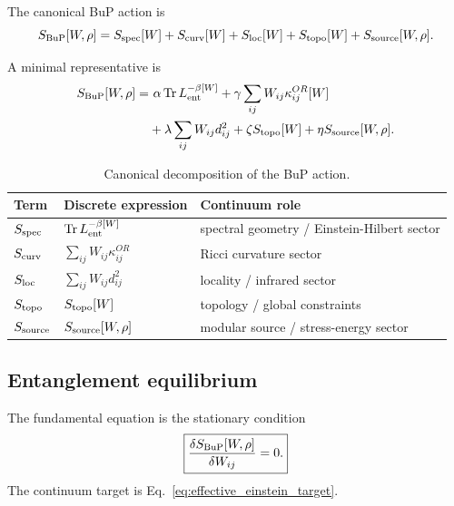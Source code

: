\documentclass[11pt,a4paper]{article}
\begin{document}
The canonical BuP action is
\begin{equation}
  S_{\rm BuP}[W,\rho]
  =
  S_{\rm spec}[W]
  +
  S_{\rm curv}[W]
  +
  S_{\rm loc}[W]
  +
  S_{\rm topo}[W]
  +
  S_{\rm source}[W,\rho].
  \label{eq:canonical_action_decomposition}
\end{equation}

A minimal representative is
\begin{equation}
\begin{aligned}
  S_{\rm BuP}[W,\rho]
  =
  &\ \alpha\,\mathrm{Tr}\,L_{\rm ent}^{-\beta[W]}
  +
  \gamma\sum_{ij}W_{ij}\kappa_{ij}^{OR}[W] \\
  &+
  \lambda\sum_{ij}W_{ij}d_{ij}^{2}
  +
  \zeta S_{\rm topo}[W]
  +
  \eta S_{\rm source}[W,\rho].
\end{aligned}
\label{eq:minimal_bup_action}
\end{equation}

\begin{table}[h]
\centering
\begin{tabular}{lll}
\toprule
Term & Discrete expression & Continuum role \\
\midrule
\(S_{\rm spec}\) &
\(\mathrm{Tr}\,L_{\rm ent}^{-\beta[W]}\) &
spectral geometry / Einstein-Hilbert sector \\
\(S_{\rm curv}\) &
\(\sum_{ij}W_{ij}\kappa^{OR}_{ij}\) &
Ricci curvature sector \\
\(S_{\rm loc}\) &
\(\sum_{ij}W_{ij}d_{ij}^{2}\) &
locality / infrared sector \\
\(S_{\rm topo}\) &
\(S_{\rm topo}[W]\) &
topology / global constraints \\
\(S_{\rm source}\) &
\(S_{\rm source}[W,\rho]\) &
modular source / stress-energy sector \\
\bottomrule
\end{tabular}
\caption{Canonical decomposition of the BuP action.}
\label{tab:action_terms}
\end{table}

\subsection{Entanglement equilibrium}

The fundamental equation is the stationary condition
\begin{equation}
  \boxed{
  \frac{\delta S_{\rm BuP}[W,\rho]}{\delta W_{ij}}=0.
  }
\end{equation}
The continuum target is Eq.~\eqref{eq:effective_einstein_target}.
\end{document}
